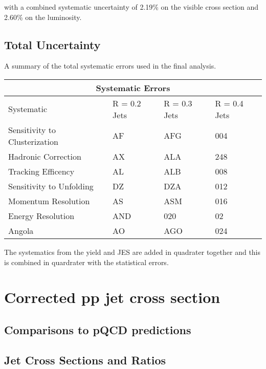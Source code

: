 \noindent
with a combined systematic uncertainty of 2.19\% on the visible cross section and 2.60\% on the luminosity. 


\subsection{Total Uncertainty}

A summary of the total systematic errors used in the final analysis.

\begin{tabular}{ |p{5cm}||p{3cm}|p{3cm}|p{3cm}|  }
 \hline
 \multicolumn{4}{|c|}{Systematic Errors} \\
 \hline
 Systematic &R = 0.2 Jets & R = 0.3 Jets& R = 0.4 Jets\\
 \hline
Sensitivity to Clusterization   & AF    &AFG&   004\\
Hadronic Correction&   AX  & ALA   &248\\
Tracking Efficency &AL & ALB&  008\\
Sensitivity to Unfolding&DZ & DZA&  012\\
Momentum Resolution&   AS  & ASM&016\\
Energy Resolution& AND   &020 & 02\\
 Angola& AO  & AGO&024\\
 \hline

\end{tabular}
\noindent

The systematics from the yield and JES are added in quadrater together and this is combined in quardrater with the statistical errors.

\section{Corrected pp jet cross section}


\subsection{Comparisons to pQCD predictions}

\subsection{Jet Cross Sections and Ratios}



